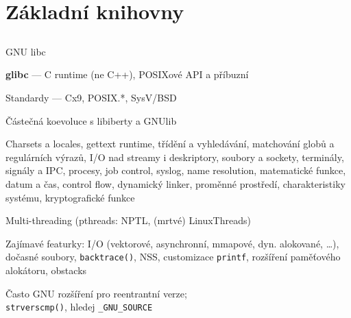 \documentclass{beamer}
\begin{document}
\section{Základní knihovny}

\subsection{}
\begin{frame}{GNU libc}
\begin{itemize}
\item {\bf glibc} --- C runtime (ne C++), POSIXové API a příbuzní
\item Standardy --- Cx9, POSIX.*, SysV/BSD
\item Částečná koevoluce s libiberty a GNUlib
{\footnotesize \item Charsets a locales, gettext runtime, třídění a vyhledávání, matchování globů a regulárních výrazů, I/O nad streamy i deskriptory, soubory a sockety, terminály, signály a IPC, procesy, job control, syslog, name resolution, matematické funkce, datum a čas, control flow, dynamický linker, proměnné prostředí, charakteristiky systému, kryptografické funkce}
\item Multi-threading (pthreads: NPTL, (mrtvé) LinuxThreads)
\item Zajímavé featurky: I/O (vektorové, asynchronní, mmapové, dyn. alokované, \dots), dočasné soubory, {\tt backtrace()}, NSS, customizace {\tt printf}, rozšíření paměťového alokátoru, obstacks
\item Často GNU rozšíření pro reentrantní verze; \\ {\tt strverscmp()}, hledej {\tt \_GNU\_SOURCE}
\end{itemize}
\end{frame}

\subsection{}
\end{document}
